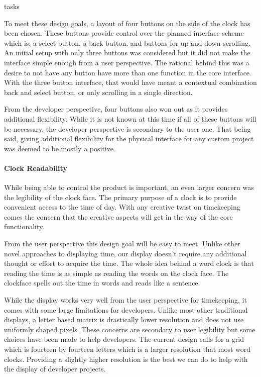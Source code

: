 tasks\documentclass[onecolumn, draftclsnofoot,10pt, compsoc]{IEEEtran}
\begin{document}
\vspace{2mm} To meet these design goals, a layout of four buttons on the side of the clock has been chosen.
These buttons provide control over the planned interface scheme which is: a select button, a back button, and buttons for up and down scrolling.
An initial setup with only three buttons was considered but it did not make the interface simple enough from a user perspective.
The rational behind this was a desire to not have any button have more than one function in the core interface.
With the three button interface, that would have meant a contextual combination back and select button, or only scrolling in a single direction.

\vspace{2mm} From the developer perspective, four buttons also won out as it provides additional flexibility.
While it is not known at this time if all of these buttons will be necessary, the developer perspective is secondary to the user one.
That being said, giving additional flexibility for the physical interface for any custom project was deemed to be mostly a positive.
\vspace{1mm}
\paragraph{Clock Readability}

\vspace{2mm} While being able to control the product is important, an even larger concern was the legibility of the clock face.
The primary purpose of a clock is to provide convenient access to the time of day.
With any creative twist on timekeeping comes the concern that the creative aspects will get in the way of the core functionality.

\vspace{2mm} From the user perspective this design goal will be easy to meet.
Unlike other novel approaches to displaying time, our display doesn't require any additional thought or effort to acquire the time.
The whole idea behind a word clock is that reading the time is as simple as reading the words on the clock face.
The clockface spells out the time in words and reads like a sentence.

\vspace{2mm} While the display works very well from the user perspective for timekeeping, it comes with some large limitations for developers.
Unlike most other traditional displays, a letter based matrix is drastically lower resolution and does not use uniformly shaped pixels.
These concerns are secondary to user legibility but some choices have been made to help developers.
The current design calls for a grid which is fourteen by fourteen letters which is a larger resolution that most word clocks.
Providing a slightly higher resolution is the best we can do to help with the display of developer projects.
\end{document}
